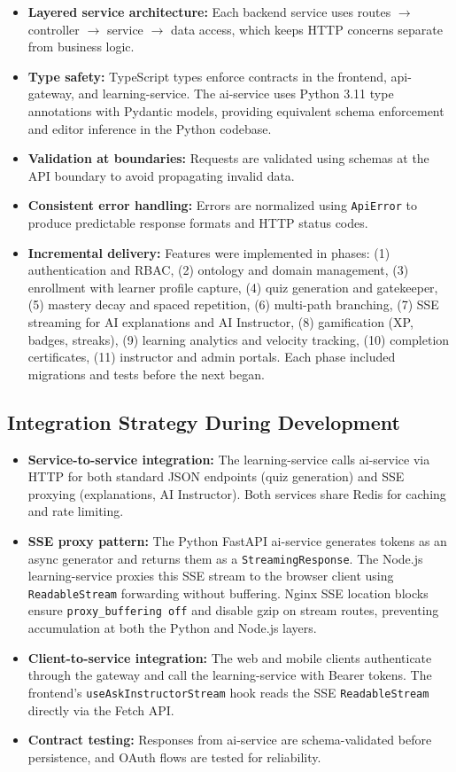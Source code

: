 \begin{itemize}
    \item \textbf{Layered service architecture:} Each backend service uses routes $\rightarrow$ controller $\rightarrow$ service $\rightarrow$ data access, which keeps HTTP concerns separate from business logic.
    \item \textbf{Type safety:} TypeScript types enforce contracts in the frontend, api-gateway, and learning-service. The ai-service uses Python 3.11 type annotations with Pydantic models, providing equivalent schema enforcement and editor inference in the Python codebase.
    \item \textbf{Validation at boundaries:} Requests are validated using schemas at the API boundary to avoid propagating invalid data.
    \item \textbf{Consistent error handling:} Errors are normalized using \texttt{ApiError} to produce predictable response formats and HTTP status codes.
    \item \textbf{Incremental delivery:} Features were implemented in phases: (1) authentication and RBAC, (2) ontology and domain management, (3) enrollment with learner profile capture, (4) quiz generation and gatekeeper, (5) mastery decay and spaced repetition, (6) multi-path branching, (7) SSE streaming for AI explanations and AI Instructor, (8) gamification (XP, badges, streaks), (9) learning analytics and velocity tracking, (10) completion certificates, (11) instructor and admin portals. Each phase included migrations and tests before the next began.
\end{itemize}

\subsection{Integration Strategy During Development}

\begin{itemize}
    \item \textbf{Service-to-service integration:} The learning-service calls ai-service via HTTP for both standard JSON endpoints (quiz generation) and SSE proxying (explanations, AI Instructor). Both services share Redis for caching and rate limiting.
    \item \textbf{SSE proxy pattern:} The Python FastAPI ai-service generates tokens as an async generator and returns them as a \texttt{StreamingResponse}. The Node.js learning-service proxies this SSE stream to the browser client using \texttt{ReadableStream} forwarding without buffering. Nginx SSE location blocks ensure \texttt{proxy\_buffering off} and disable gzip on stream routes, preventing accumulation at both the Python and Node.js layers.
    \item \textbf{Client-to-service integration:} The web and mobile clients authenticate through the gateway and call the learning-service with Bearer tokens. The frontend's \texttt{useAskInstructorStream} hook reads the SSE \texttt{ReadableStream} directly via the Fetch API.
    \item \textbf{Contract testing:} Responses from ai-service are schema-validated before persistence, and OAuth flows are tested for reliability.
\end{itemize}

